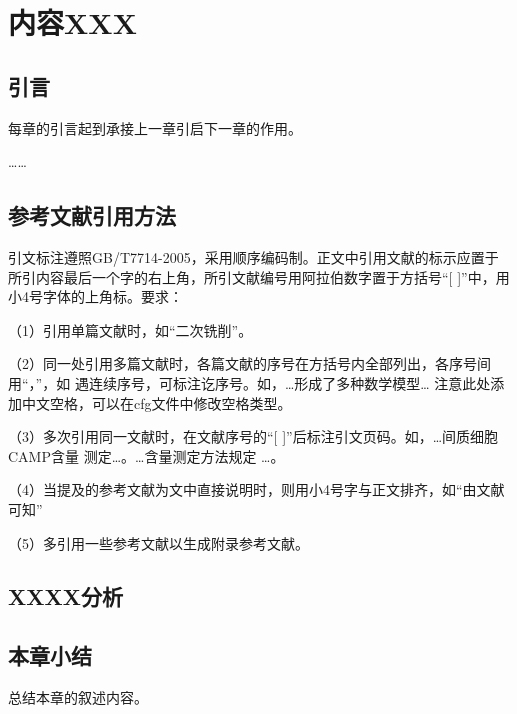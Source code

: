 
\chapter{内容XXX}

\section{引言}

每章的引言起到承接上一章引启下一章的作用。

\ldots\ldots

\section{参考文献引用方法}

引文标注遵照GB/T7714-2005，采用顺序编码制。正文中引用文献的标示应置于所引内容最后一个字的右上角，所引文献编号用阿拉伯数字置于方括号“[ ]”中，用小4号字体的上角标。要求：

（1）引用单篇文献时，如“二次铣削\cite{ren2010}”。

（2）同一处引用多篇文献时，各篇文献的序号在方括号内全部列出，各序号间用“，”，如
遇连续序号，可标注讫序号。如，…形成了多种数学模型\cite{Gravagne2003,ren2010}…
注意此处添加中文空格，可以在cfg文件中修改空格类型。

（3）多次引用同一文献时，在文献序号的“[ ]”后标注引文页码。如，…间质细胞CAMP含量
测定\cite[100-197]{Gravagne2003}…。…含量测定方法规定
\cite[92]{Gravagne2003}…。

（4）当提及的参考文献为文中直接说明时，则用小4号字与正文排齐，如“由文献可知”

（5）多\cite{liu2016}引\cite{fu2018}用\cite{zhai2015}一\cite{yao2015}些\cite{jones2006}参\cite{mcmahan2005}考\cite{jones2004}文献以生成附录参考文献。

\section{XXXX分析}

\lipsum[1-2]

\section{本章小结}

总结本章的叙述内容。

\lipsum[1]
